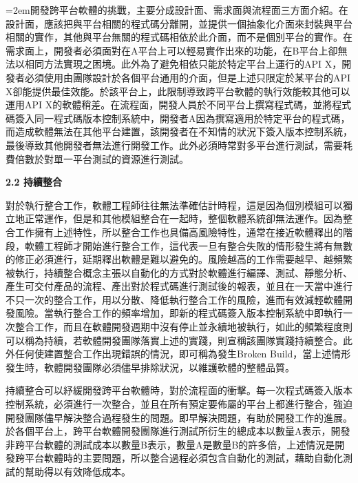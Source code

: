 \documentclass[10pt, twocolumn]{article}
\begin{document}
\parindent=2em開發跨平台軟體的挑戰，主要分成設計面、需求面與流程面三方面介紹。在設計面，應該把與平台相關的程式碼分離開，並提供一個抽象化介面來封裝與平台相關的實作，其他與平台無關的程式碼相依於此介面，而不是個別平台的實作\cite{gofdesignpattern}\cite{slogan}。在需求面上，開發者必須面對在A平台上可以輕易實作出來的功能，在B平台上卻無法以相同方法實現之困境。此外為了避免相依只能於特定平台上運行的API X，開發者必須使用由團隊設計於各個平台通用的介面，但是上述只限定於某平台的API X卻能提供最佳效能。於該平台上，此限制導致跨平台軟體的執行效能較其他可以運用API X的軟體稍差\cite{netscapecrossplatform}。在流程面，開發人員於不同平台上撰寫程式碼，並將程式碼簽入同一程式碼版本控制系統中，開發者A因為撰寫適用於特定平台的程式碼，而造成軟體無法在其他平台建置，該開發者在不知情的狀況下簽入版本控制系統，最後導致其他開發者無法進行開發工作。此外必須時常對多平台進行測試，需要耗費倍數於對單一平台測試的資源進行測試\cite{netscapecrossplatform}。

\begin{raggedright}\textbf{2.2 持續整合}\end{raggedright}

對於執行整合工作，軟體工程師往往無法準確估計時程，這是因為個別模組可以獨立地正常運作，但是和其他模組整合在一起時，整個軟體系統卻無法運作。因為整合工作擁有上述特性，所以整合工作也具備高風險特性，通常在接近軟體釋出的階段，軟體工程師才開始進行整合工作，這代表一旦有整合失敗的情形發生將有無數的修正必須進行，延期釋出軟體是難以避免的。風險越高的工作需要越早、越頻繁被執行，持續整合概念主張以自動化的方式對於軟體進行編譯、測試、靜態分析、產生可交付產品的流程、產出對於程式碼進行測試後的報表，並且在一天當中進行不只一次的整合工作，用以分散、降低執行整合工作的風險，進而有效減輕軟體開發風險。當執行整合工作的頻率增加，即新的程式碼簽入版本控制系統中即執行一次整合工作，而且在軟體開發週期中沒有停止並永續地被執行，如此的頻繁程度則可以稱為持續，若軟體開發團隊落實上述的實踐，則宣稱該團隊實踐持續整合。此外任何使建置整合工作出現錯誤的情況，即可稱為發生Broken Build，當上述情形發生時，軟體開發團隊必須儘早排除狀況，以維護軟體的整體品質。

持續整合可以紓緩開發跨平台軟體時，對於流程面的衝擊。每一次程式碼簽入版本控制系統，必須進行一次整合，並且在所有預定要佈屬的平台上都進行整合，強迫開發團隊儘早解決整合過程發生的問題。即早解決問題，有助於開發工作的進展。於各個平台上，跨平台軟體開發團隊進行測試所衍生的總成本以數量A表示，開發非跨平台軟體的測試成本以數量B表示，數量A是數量B的許多倍，上述情況是開發跨平台軟體時的主要問題，所以整合過程必須包含自動化的測試，藉助自動化測試的幫助得以有效降低成本。
\end{document}
